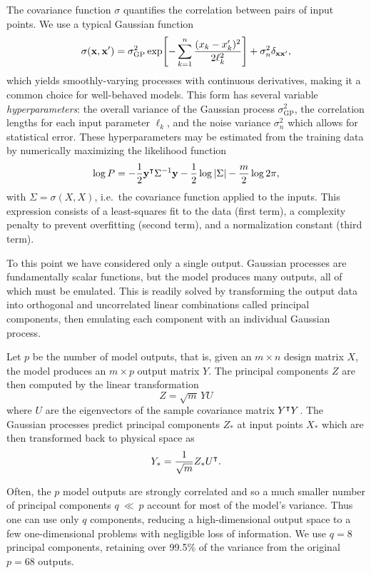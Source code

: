 \documentclass[aps,prc,reprint,amsmath,nofootinbib,superscriptaddress]{revtex4-1}
\begin{document}
The covariance function $\sigma$ quantifies the correlation between pairs of input points.
We use a typical Gaussian function
\begin{equation}
  \sigma(\mathbf x, \mathbf x') = \sigma_\text{GP}^2 \exp\Biggl[ -\sum_{k=1}^n \frac{(x_k - x'_k)^2}{2\ell_k^2} \Biggr] + \sigma_n^2\delta_{\mathbf x\mathbf x'},
\end{equation}
which yields smoothly-varying processes with continuous derivatives, making it a common choice for well-behaved models.
This form has several variable \emph{hyperparameters}:
the overall variance of the Gaussian process $\sigma_\text{GP}^2$,
the correlation lengths for each input parameter $\ell_k$,
and the noise variance $\sigma_n^2$ which allows for statistical error.
These hyperparameters may be estimated from the training data by numerically maximizing the likelihood function
\begin{equation}
  \log P = -\frac{1}{2} \mathbf y^\intercal \Sigma^{-1} \mathbf y - \frac{1}{2} \log |\Sigma| - \frac{m}{2} \log 2\pi,
\end{equation}
with $\Sigma = \sigma(X, X)$, i.e.\ the covariance function applied to the inputs.
This expression consists of a least-squares fit to the data (first term), a complexity penalty to prevent overfitting (second term), and a normalization constant (third term).

To this point we have considered only a single output.
Gaussian processes are fundamentally scalar functions, but the model produces many outputs, all of which must be emulated.
This is readily solved by transforming the output data into orthogonal and uncorrelated linear combinations called principal components, then emulating each component with an individual Gaussian process.

Let $p$ be the number of model outputs, that is, given an $m \times n$ design matrix $X$, the model produces an $m \times p$ output matrix $Y$.
The principal components $Z$ are then computed by the linear transformation
\begin{equation}
  Z = \sqrt m \, Y U
\end{equation}
where $U$ are the eigenvectors of the sample covariance matrix $Y^\intercal Y$.
The Gaussian processes predict principal components $Z_*$ at input points $X_*$ which are then transformed back to physical space as
\begin{equation}
  Y_* = \frac{1}{\sqrt m} Z_* U^\intercal.
\end{equation}

Often, the $p$ model outputs are strongly correlated and so a much smaller number of principal components $q~\ll~p$ account for most of the model's variance.
Thus one can use only $q$ components, reducing a high-dimensional output space to a few one-dimensional problems with negligible loss of information.
We use $q = 8$ principal components, retaining over 99.5\% of the variance from the original $p = 68$ outputs.
\end{document}

